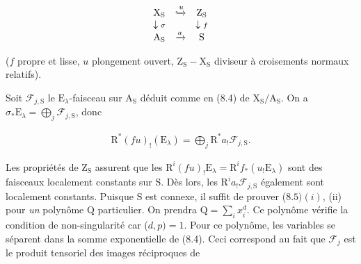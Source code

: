 \documentclass[10pt,leqno]{article}
\begin{document}
\[\begin{array}{ccc}\mathrm X_{\mathrm S}&\xhookrightarrow{u}&\mathrm Z_{\mathrm S}\\ \downarrow{\scriptstyle\sigma}&&\downarrow{\scriptstyle f}\\ \mathrm A_{\mathrm S}&\xrightarrow{a}&\mathrm S\end{array}\]

\noindent (\(f\) propre et lisse, \(u\) plongement ouvert, \(\mathrm{Z}_{\mathrm{S}}-\mathrm{X}_{\mathrm{S}}\) diviseur à croisements normaux relatifs).\par

\noindent Soit \(\mathcal{F} _{j,\mathrm{S}}\) le \(\mathrm{E}_{\lambda }\)-faisceau sur \(\mathrm{A}_{\mathrm{S}}\) déduit comme en (8.4) de \(\mathrm{X}_{\mathrm{S}}/\mathrm{A}_{\mathrm{S}}\). On a \(\sigma _{*}\mathrm{E}_{\lambda } = \bigoplus\limits_{j} \mathcal{F} _{j,\mathrm{S}}\), donc\par

\begin{equation*}\begin{gathered}\mathrm{R}^{*}(fu)_{!}(\mathrm{E}_{\lambda }) = \bigoplus\limits_{j} \mathrm{R}^{*}a_{!}\mathcal{F} _{j,\mathrm{S}}.\end{gathered}\end{equation*}

\noindent Les propriétés de \(\mathrm{Z}_{\mathrm{S}}\) assurent que les \(\mathrm{R}^{i}(fu)_{!}\mathrm{E}_{\lambda } = \mathrm{R}^{i}f_{*}(u_{!}\mathrm{E}_{\lambda })\) sont des faisceaux localement constants sur \(\mathrm{S}\). Dès lors, les \(\mathrm{R}^{i}a_{!}\mathcal{F} _{j,\mathrm{S}}\) également sont localement constants. Puisque \(\mathrm{S}\) est connexe, il suffit de prouver (\(8.5) (i)\), (ii) pour \emph{un} polynôme \(\mathrm{Q}\) particulier. On prendra \(\mathrm{Q} = \sum _{i} x_{i}^{d}\). Ce polynôme vérifie la condition de non-singularité car (\(d,p) = 1\). Pour ce polynôme, les variables se séparent dans la somme exponentielle de (8.4). Ceci correspond au fait que \(\mathcal{F} _{j}\) est le produit tensoriel des images réciproques de\par
{}\thispagestyle{signature305}

\clearpage

\label{physical-35}\par\smallskip
\end{document}
